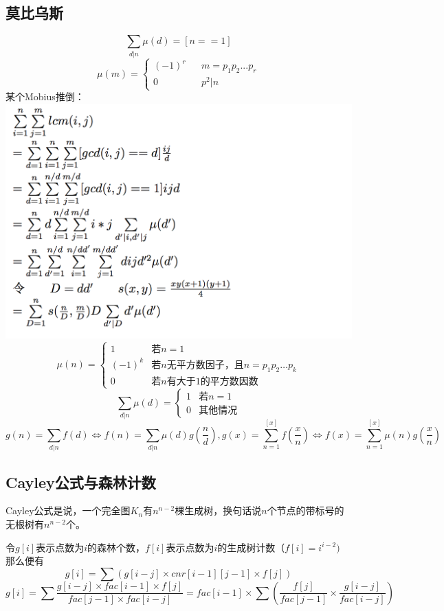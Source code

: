 \documentclass[11pt]{article}
\begin{document}
		\subsection{莫比乌斯}
		$$\sum_{d|n}\mu(d)=[n==1]$$ 
		$$ \mu(m)=\left\{
		\begin{array}{rcl}
		(-1)^r      &      & {m=p_1p_2...p_r}\\
		0  &      & {p^2|n}
		\end{array} \right.
		$$
		某个Mobius推倒：\\
		\includegraphics{Mobius.png}
		$$\mu(n) = \begin{cases}
	1 & \text{若}n=1\\
	(-1)^k & \text{若}n\text{无平方数因子，且}n = p_1p_2\dots p_k\\
	0 & \text{若}n\text{有大于}1\text{的平方数因数}
\end{cases}$$
$$\sum_{d|n}{\mu(d)} = \begin{cases}
	1 & \text{若}n=1\\
	0 & \text{其他情况}
\end{cases}$$
$$g(n) = \sum_{d|n}{f(d)} \Leftrightarrow f(n) = \sum_{d|n}{\mu(d)g(\frac{n}{d})}
,       g(x) = \sum_{n=1}^{[x]}f(\frac{x}{n}) \Leftrightarrow f(x) = \sum_{n=1}^{[x]}{\mu(n)g(\frac{x}{n})}$$

		\subsection{Cayley公式与森林计数}
		Cayley公式是说，一个完全图$K_n$有$n^{n-2}$棵生成树，换句话说$n$个节点的带标号的无根树有$n^{n-2}$个。

令$g[i]$表示点数为$i$的森林个数，$f[i]$表示点数为$i$的生成树计数$（f[i]=i^{i-2})$
那么便有$$g[i]=\sum (g[i-j] \times cnr[i-1][j-1] \times f[j])$$
$$g[i]=\sum \frac{g[i-j] \times fac[i-1] \times f[j]}{fac[j-1] \times fac[i-j]}=fac[i-1] \times \sum (\frac{f[j]}{fac[j-1]} \times \frac{g[i-j]}{fac[i-j]})$$
	
\end{document}
